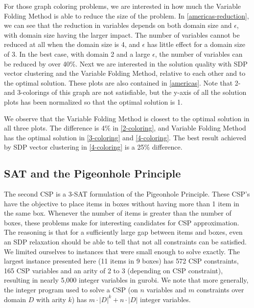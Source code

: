 \documentclass[12pt]{article} %
\begin{document}
For those graph coloring problems, we are interested in how much the Variable Folding Method is able to reduce the size of the problem. In \autoref{americas-reduction}, we can see that the reduction in variables depends on both domain size and $\epsilon$, with domain size having the larger impact. The number of variables cannot be reduced at all when the domain size is 4, and $\epsilon$ has little effect for a domain size of 3. In the best case, with domain 2 and a large $\epsilon$, the number of variables can be reduced by over 40\%. Next we are interested in the solution quality with SDP vector clustering and the Variable Folding Method, relative to each other and to the optimal solution. These plots are also contained in \autoref{americas}. Note that 2- and 3-colorings of this graph are not satisfiable, but the y-axis of all the solution plots has been normalized so that the optimal solution is 1. 

We observe that the Variable Folding Method is closest to the optimal solution in all three plots. The difference is 4\% in \ref{2-coloring}, and Variable Folding Method has the optimal solution in \ref{3-coloring} and \ref{4-coloring}. The best result achieved by SDP vector clustering in \ref{4-coloring} is a 25\% difference.

\subsection{SAT and the Pigeonhole Principle}

The second CSP is a 3-SAT formulation of the Pigeonhole Principle. These CSP's have the objective to place items in boxes without having more than 1 item in the same box. Whenever the number of items is greater than the number of boxes, these problems make for interesting candidates for CSP approximation. The reasoning is that for a sufficiently large gap between items and boxes, even an SDP relaxation should be able to tell that not all constraints can be satisfied. We limited ourselves to instances that were small enough to solve exactly. The largest instance presented here (11 items in 9 boxes) has 572 CSP constraints, 165 CSP variables and an arity of 2 to 3 (depending on CSP constraint), resulting in nearly 5,000 integer variables in gurobi. We note that more generally, the integer program used to solve a CSP (on $n$ variables and $m$ constraints over domain $D$ with arity $k$) has $m \cdot |D|^k + n \cdot |D|$ integer variables.
\end{document}
